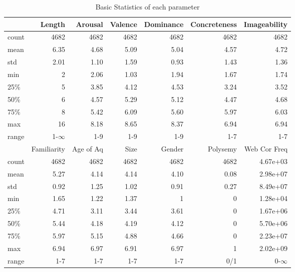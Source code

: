 \documentclass[a4paper,11pt,dvipsnames]{article}
\begin{document}
\begin{table}[h]
    \centering
\begin{tabular}{l|r|r|r|r|r|r}    
{} &       Length &      Arousal &      Valence &    Dominance &  Concreteness &  Imageability \\
\hline
count &  4682  &  4682  &  4682  &  4682  &   4682  &   4682  \\
mean  &     6.35 &     4.68 &     5.09 &     5.04 &      4.57 &      4.72 \\
std   &     2.01 &     1.10 &     1.59 &     0.93 &      1.43  &      1.36 \\
min   &     2  &     2.06 &     1.03 &     1.94 &      1.67 &      1.74 \\
25\%   &     5  &     3.85 &     4.12 &     4.53 &      3.24 &      3.52 \\
50\%   &     6  &     4.57 &     5.29 &     5.12 &      4.47 &      4.68 \\
75\%   &     8  &     5.42 &     6.09 &     5.60 &      5.97 &      6.03 \\
max   &    16  &     8.18 &     8.65 &     8.37 &      6.94 &      6.94 \\
range & 1-$\infty$ & 1-9 & 1-9 & 1-9 & 1-7 & 1-7 \\
\hline
\hline
{} &  Familiarity & Age of Aq &      Size &       Gender &     Polysemy &  Web Cor Freq \\
\hline
count &  4682  &  4682  &  4682  &  4682  &  4682  &     4.67e+03 \\
mean  &     5.27 &     4.14 &     4.14 &     4.10 &     0.08  &     2.98e+07 \\
std   &     0.92  &     1.25  &     1.02  &     0.91  &     0.27  &     8.49e+07 \\
min   &     1.65 &     1.22 &     1.37 &     1  &     0  &     1.28e+04 \\
25\%   &     4.71 &     3.11  &     3.44 &     3.61 &     0  &     1.67e+06 \\
50\%   &     5.44 &     4.18 &     4.19 &     4.12 &     0  &     5.70e+06 \\
75\%   &     5.97 &     5.15 &     4.88 &     4.66 &     0  &     2.23e+07 \\
max   &     6.94 &     6.97 &     6.91 &     6.97 &     1  &     2.02e+09 \\
range & 1-7 & 1-7 & 1-7 & 1-7 & 0/1 & 0-$\infty$ \\
\hline
\end{tabular}
\caption{Basic Statistics of each parameter}\label{tab:stat}

\end{table}
%
\end{document}
